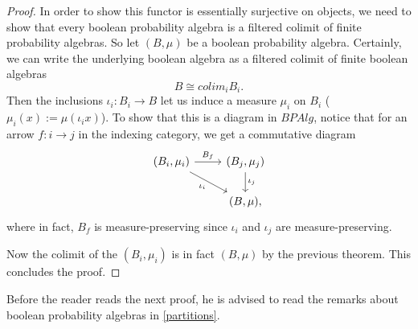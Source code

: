 \documentclass[a4paper]{amsproc}
\theoremstyle{plain}
\theoremstyle{definition}
\theoremstyle{remark}
\numberwithin{equation}{section}
\begin{document}
\begin{proof}
In order to show this functor is essentially surjective on objects, we need to show that every boolean probability algebra is a filtered colimit of finite probability algebras. So let $(B, \mu)$ be a boolean probability algebra. Certainly, we can write the underlying boolean algebra as a filtered colimit of finite boolean algebras
\[
B \cong colim_i B_i.
\]
Then the inclusions $\iota_i: B_i \to B$ let us induce a measure $\mu_i$ on $B_i$ ($\mu_i(x) := \mu(\iota_i x)$). To show that this is a diagram in $BPAlg$, notice that for an arrow $f: i \to j$ in the indexing category, we get a commutative diagram
\[
\begin{tikzcd}
{(B_i,\mu_i)} \arrow[r, "B_f"] \arrow[rd, "\iota_i"'] & {(B_j,\mu_j)} \arrow[d, "\iota_j"] \\
                                                      & {(B,\mu)}                         ,
\end{tikzcd}
\]
where in fact, $B_f$ is measure-preserving since $\iota_i$ and $\iota_j$ are measure-preserving.

Now the colimit of the $(B_i, \mu_i)$ is in fact $(B, \mu)$ by the previous theorem. This concludes the proof.
\end{proof}

Before the reader reads the next proof, he is advised to read the remarks about boolean probability algebras in \ref{partitions}.
\end{document}
